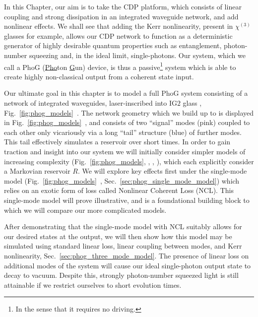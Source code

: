 In this Chapter, our aim is to take the CDP platform, which consists of linear coupling and strong dissipation in an integrated waveguide network, and add nonlinear effects. We shall see that adding the Kerr nonlinearity, present in $\chi^{\left(3\right)}$ glasses for example, allows our CDP network to function as a deterministic generator of highly desirable quantum properties such as entanglement, photon-number squeezing and, in the ideal limit, single-photons. Our system, which we call a PhoG (\underline{Pho}ton \underline{G}un) device, is thus a passive\footnote{In the sense that it requires no driving.} system which is able to create highly non-classical output from a coherent state input.


Our ultimate goal in this chapter is to model a full PhoG system consisting of a network of integrated waveguides, laser-inscribed into IG$2$ glass \cite{ig2}, Fig.~\ref{fig:phog_models}~\MakeUppercase{}. The network geometry which we build up to is displayed in Fig.~\ref{fig:phog_models}~, and consists of two ``signal'' modes (pink) coupled to each other only vicariously via a long ``tail'' structure (blue) of further modes. This tail effectively simulates a reservoir over short times. In order to gain traction and insight into our system we will initially consider simpler models of increasing complexity (Fig.~\ref{fig:phog_models}, , , ), which each explicitly consider a Markovian reservoir $R$. We will explore key effects first under the single-mode model (Fig.~\ref{fig:phog_models}~, Sec.~\ref{sec:phog_single_mode_model}) which relies on an exotic form of loss called Nonlinear Coherent Loss (NCL). This single-mode model will prove illustrative, and is a foundational building block to which we will compare our more complicated models.


After demonstrating that the single-mode model with NCL suitably allows for our desired states at the output, we will then show how this model may be simulated using standard linear loss, linear coupling between modes, and Kerr nonlinearity, Sec.~\ref{sec:phog_three_mode_model}. The presence of linear loss on additional modes of the system will cause our ideal single-photon output state to decay to vacuum. Despite this, strongly photon-number squeezed light is still attainable if we restrict ourselves to short evolution times. 

